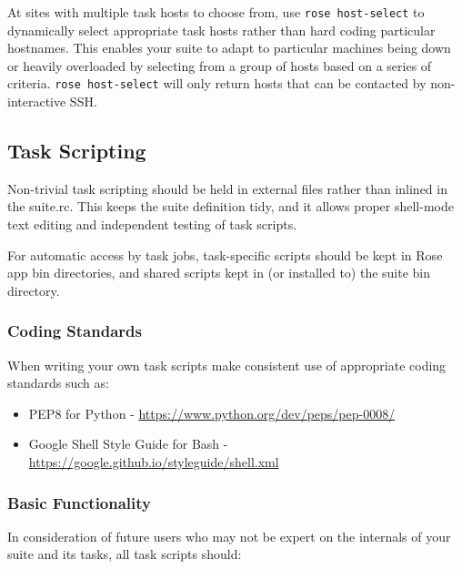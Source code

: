 At sites with multiple task hosts to choose from, use
\lstinline=rose host-select= to dynamically select appropriate task hosts
rather than hard coding particular hostnames. This enables your suite to
adapt to particular machines being down or heavily overloaded by selecting
from a group of hosts based on a series of criteria.
\lstinline=rose host-select= will only return hosts that can be contacted by
non-interactive SSH.

\subsection{Task Scripting}

Non-trivial task scripting should be held in external files rather than
inlined in the suite.rc. This keeps the suite definition tidy, and it
allows proper shell-mode text editing and independent testing of task scripts.

For automatic access by task jobs, task-specific scripts should be kept in 
Rose app bin directories, and shared scripts kept in (or installed to) the
suite bin directory.

\subsubsection{Coding Standards}

When writing your own task scripts make consistent use of appropriate coding
standards such as:

\begin{itemize}
    \item PEP8 for Python - \url{https://www.python.org/dev/peps/pep-0008/}
    \item Google Shell Style Guide for Bash -
      \url{https://google.github.io/styleguide/shell.xml}
\end{itemize}

\subsubsection{Basic Functionality}

In consideration of future users who may not be expert on the internals of your
suite and its tasks, all task scripts should:


